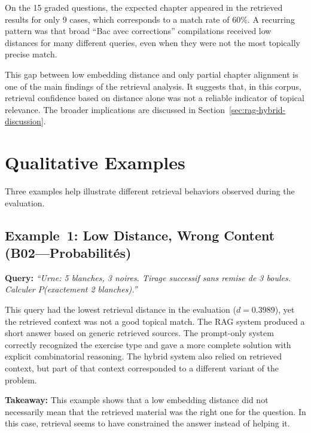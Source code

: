 On the 15 graded questions, the expected chapter appeared in the retrieved
results for only 9 cases, which corresponds to a match rate of 60\%.
A recurring pattern was that broad ``Bac avec corrections'' compilations
received low distances for many different queries, even when they were not
the most topically precise match.

This gap between low embedding distance and only partial chapter alignment is
one of the main findings of the retrieval analysis. It suggests that, in
this corpus, retrieval confidence based on distance alone was not a reliable
indicator of topical relevance. The broader implications are discussed in
Section~\ref{sec:rag-hybrid-discussion}.
\section{Qualitative Examples}
\label{sec:qualitative-examples}

Three examples help illustrate different retrieval behaviors observed during
the evaluation.


\subsection{Example~1: Low Distance, Wrong Content (B02---Probabilités)}

\noindent\textbf{Query:} \textit{``Urne: 5 blanches, 3 noires. Tirage
successif sans remise de 3 boules. Calculer $P$(exactement 2 blanches).''}

This query had the lowest retrieval distance in the evaluation
($d = 0.3989$), yet the retrieved context was not a good topical match. The
RAG system produced a short answer based on generic retrieved sources. The
prompt-only system correctly recognized the exercise type and gave a more
complete solution with explicit combinatorial reasoning. The hybrid system
also relied on retrieved context, but part of that context corresponded to a
different variant of the problem.

\noindent\textbf{Takeaway:} This example shows that a low embedding distance
did not necessarily mean that the retrieved material was the right one for
the question. In this case, retrieval seems to have constrained the answer
instead of helping it.

